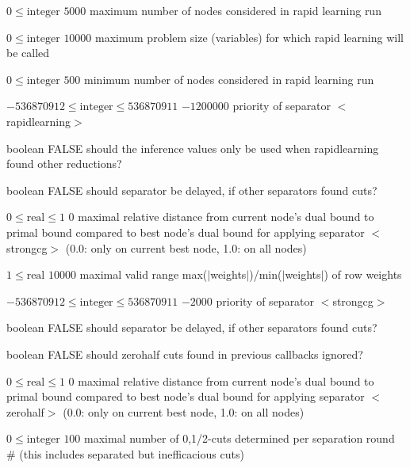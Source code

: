 %
{$0\leq\textrm{integer}$}%
{$5000$}%
{maximum number of nodes considered in rapid learning run}%
{}

%
{$0\leq\textrm{integer}$}%
{$10000$}%
{maximum problem size (variables) for which rapid learning will be called}%
{}

%
{$0\leq\textrm{integer}$}%
{$500$}%
{minimum number of nodes considered in rapid learning run}%
{}

%
{$-536870912\leq\textrm{integer}\leq536870911$}%
{$-1200000$}%
{priority of separator $<$rapidlearning$>$}%
{}

%
{boolean}%
{FALSE}%
{should the inference values only be used when rapidlearning found other reductions?}%
{}

%
{boolean}%
{FALSE}%
{should separator be delayed, if other separators found cuts?}%
{}

%
{$0\leq\textrm{real}\leq1$}%
{$0$}%
{maximal relative distance from current node's dual bound to primal bound compared to best node's dual bound for applying separator $<$strongcg$>$ (0.0: only on current best node, 1.0: on all nodes)}%
{}

%
{$1\leq\textrm{real}$}%
{$10000$}%
{maximal valid range max($|$weights$|$)/min($|$weights$|$) of row weights}%
{}

%
{$-536870912\leq\textrm{integer}\leq536870911$}%
{$-2000$}%
{priority of separator $<$strongcg$>$}%
{}

%
{boolean}%
{FALSE}%
{should separator be delayed, if other separators found cuts?}%
{}

%
{boolean}%
{FALSE}%
{should zerohalf cuts found in previous callbacks ignored?}%
{}

%
{$0\leq\textrm{real}\leq1$}%
{$0$}%
{maximal relative distance from current node's dual bound to primal bound compared to best node's dual bound for applying separator $<$zerohalf$>$ (0.0: only on current best node, 1.0: on all nodes)}%
{}

%
{$0\leq\textrm{integer}$}%
{$100$}%
{maximal number of {0,1/2}-cuts determined per separation round \\   \#                      (this includes separated but inefficacious cuts)}%
{}

